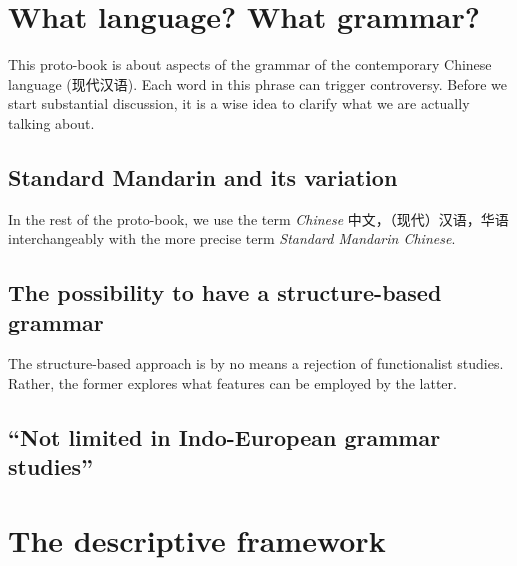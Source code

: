 \documentclass[../main.tex]{subfiles}
\begin{document}
\section{What language? What grammar?}

This proto-book is about aspects of the grammar of the contemporary Chinese language (现代汉语). 
Each word in this phrase can trigger controversy. Before we start substantial discussion, it is a wise idea 
to clarify what we are actually talking about. 

\subsection{Standard Mandarin and its variation}


In the rest of the proto-book, we use the term \emph{Chinese} 中文，（现代）汉语，华语 interchangeably with 
the more precise term \emph{Standard Mandarin Chinese}.

\subsection{The possibility to have a structure-based grammar}

The structure-based approach is by no means a rejection of functionalist studies. Rather, the former explores 
what features can be employed by the latter.

\subsection{``Not limited in Indo-European grammar studies''}


\section{The descriptive framework}
\end{document}
